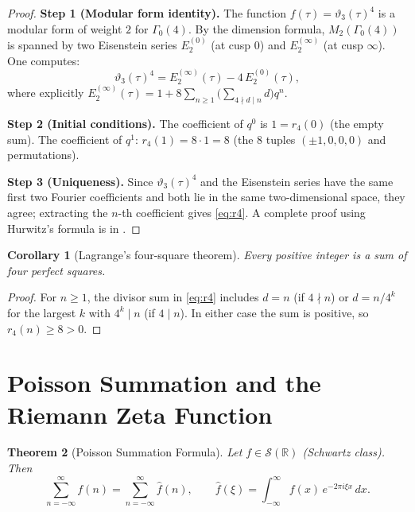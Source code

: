 \documentclass[12pt,a4paper]{amsart}
\newtheorem{theorem}{Theorem}[section]
\newtheorem{corollary}[theorem]{Corollary}
\theoremstyle{definition}
\begin{document}
\begin{proof}
\textbf{Step 1 (Modular form identity).}
The function $f(\tau) = \vartheta_3(\tau)^4$ is a modular form of weight $2$
for $\Gamma_0(4)$.  By the dimension formula, $M_2(\Gamma_0(4))$ is spanned by
two Eisenstein series $E_2^{(0)}$ (at cusp $0$) and $E_2^{(\infty)}$ (at cusp $\infty$).
One computes:
\[
  \vartheta_3(\tau)^4
  = E_2^{(\infty)}(\tau) - 4\, E_2^{(0)}(\tau),
\]
where explicitly
$E_2^{(\infty)}(\tau) = 1 + 8\sum_{n\geq1}\bigl(\sum_{4\nmid d \mid n} d\bigr) q^n$.

\textbf{Step 2 (Initial conditions).}
The coefficient of $q^0$ is $1 = r_4(0)$ (the empty sum).
The coefficient of $q^1$: $r_4(1) = 8\cdot 1 = 8$
(the $8$ tuples $(\pm1,0,0,0)$ and permutations). \checkmark

\textbf{Step 3 (Uniqueness).}
Since $\vartheta_3(\tau)^4$ and the Eisenstein series have the same first two
Fourier coefficients and both lie in the same two-dimensional space,
they agree; extracting the $n$-th coefficient gives \eqref{eq:r4}.
A complete proof using Hurwitz's formula is in \cite{Grosswald1985}.
\end{proof}

\begin{corollary}[Lagrange's four-square theorem]
Every positive integer is a sum of four perfect squares.
\end{corollary}

\begin{proof}
For $n \geq 1$, the divisor sum in \eqref{eq:r4} includes $d = n$ (if $4\nmid n$)
or $d = n/4^k$ for the largest $k$ with $4^k \mid n$ (if $4\mid n$).
In either case the sum is positive, so $r_4(n) \geq 8 > 0$.
\end{proof}

\section{Poisson Summation and the Riemann Zeta Function}\label{sec:poisson}

\begin{theorem}[Poisson Summation Formula]\label{thm:poisson}
Let $f \in \mathcal{S}(\mathbb{R})$ (Schwartz class). Then
\[
  \sum_{n=-\infty}^{\infty} f(n) = \sum_{n=-\infty}^{\infty} \hat{f}(n),
  \qquad \hat{f}(\xi) = \int_{-\infty}^{\infty} f(x)\, e^{-2\pi i \xi x}\,dx.
\]
\end{theorem}
\end{document}
